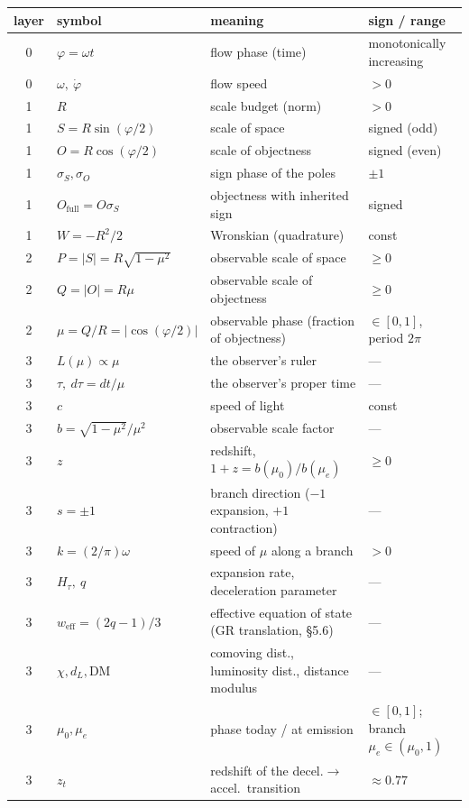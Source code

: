 \documentclass{article}
\begin{document}
\begin{table}[htbp]
\centering
\small
\begin{tabular}{@{}cll l@{}}
\toprule
\textbf{layer} & \textbf{symbol} & \textbf{meaning} & \textbf{sign / range} \\
\midrule
0 & $\varphi = \omega t$ & flow phase (time) & monotonically increasing \\
0 & $\omega,\ \dot{\varphi}$ & flow speed & $> 0$ \\
1 & $R$ & scale budget (norm) & $> 0$ \\
1 & $S = R\sin(\varphi/2)$ & scale of space & signed (odd) \\
1 & $O = R\cos(\varphi/2)$ & scale of objectness & signed (even) \\
1 & $\sigma_S, \sigma_O$ & sign phase of the poles & $\pm 1$ \\
1 & $O_{\text{full}} = O\sigma_S$ & objectness with inherited sign & signed \\
1 & $W = -R^2/2$ & Wronskian (quadrature) & const \\
2 & $P = |S| = R\sqrt{1-\mu^2}$ & observable scale of space & $\ge 0$ \\
2 & $Q = |O| = R\mu$ & observable scale of objectness & $\ge 0$ \\
2 & $\mu = Q/R = |\cos(\varphi/2)|$ & observable phase (fraction of objectness) & $\in [0,1]$, period $2\pi$ \\
3 & $L(\mu) \propto \mu$ & the observer's ruler & --- \\
3 & $\tau,\ d\tau = dt/\mu$ & the observer's proper time & --- \\
3 & $c$ & speed of light & const \\
3 & $b = \sqrt{1-\mu^2}/\mu^2$ & observable scale factor & --- \\
3 & $z$ & redshift, $1+z = b(\mu_0)/b(\mu_e)$ & $\ge 0$ \\
3 & $s = \pm 1$ & branch direction ($-1$ expansion, $+1$ contraction) & --- \\
3 & $k = (2/\pi)\omega$ & speed of $\mu$ along a branch & $> 0$ \\
3 & $H_\tau,\ q$ & expansion rate, deceleration parameter & --- \\
3 & $w_{\text{eff}} = (2q-1)/3$ & effective equation of state (GR translation, \S5.6) & --- \\
3 & $\chi, d_L, \text{DM}$ & comoving dist., luminosity dist., distance modulus & --- \\
3 & $\mu_0, \mu_e$ & phase today / at emission & $\in [0,1]$; branch $\mu_e \in (\mu_0, 1)$ \\
3 & $z_t$ & redshift of the decel.$\to$accel.\ transition & $\approx 0.77$ \\
\bottomrule
\end{tabular}
\end{table}
\end{document}
